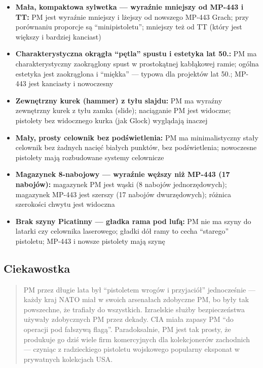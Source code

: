 \documentclass[12pt,oneside]{book}
\providecommand{\tightlist}{%
  \setlength{\itemsep}{0pt}\setlength{\parskip}{0pt}}
\begin{document}
\begin{itemize}
\tightlist
\item
  \textbf{Mała, kompaktowa sylwetka --- wyraźnie mniejszy od MP-443 i
  TT:} PM jest wyraźnie mniejszy i lżejszy od nowszego MP-443 Grach;
  przy porównaniu proporcje są ``minipistoletu''; mniejszy też od TT
  (który jest większy i bardziej kanciast)
\item
  \textbf{Charakterystyczna okrągła ``pętla'' spustu i estetyka lat
  50.:} PM ma charakterystyczny zaokrąglony spust w prostokątnej
  kabłąkowej ramie; ogólna estetyka jest zaokrąglona i ``miękka'' ---
  typowa dla projektów lat 50.; MP-443 jest kanciasty i nowoczesny
\item
  \textbf{Zewnętrzny kurek (hammer) z tyłu slajdu:} PM ma wyraźny
  zewnętrzny kurek z tyłu zamka (slide); naciąganie PM jest widoczne;
  pistolety bez widocznego kurka (jak Glock) wyglądają inaczej
\item
  \textbf{Mały, prosty celownik bez podświetlenia:} PM ma
  minimalistyczny stały celownik bez żadnych nacięć białych punktów, bez
  podświetlenia; nowoczesne pistolety mają rozbudowane systemy
  celownicze
\item
  \textbf{Magazynek 8-nabojowy --- wyraźnie węższy niż MP-443 (17
  nabojów):} magazynek PM jest wąski (8 nabojów jednorzędowych);
  magazynek MP-443 jest szerszy (17 nabojów dwurzędowych); różnica
  szerokości chwytu jest widoczna
\item
  \textbf{Brak szyny Picatinny --- gładka rama pod lufą:} PM nie ma
  szyny do latarki czy celownika laserowego; gładki dół ramy to cecha
  ``starego'' pistoletu; MP-443 i nowsze pistolety mają szynę
\end{itemize}

\subsection{Ciekawostka}\label{ciekawostka-101}

\begin{quote}
PM przez długie lata był ``pistoletem wrogów i przyjaciół'' jednocześnie
--- każdy kraj NATO miał w swoich arsenałach zdobyczne PM, bo były tak
powszechne, że trafiały do wszystkich. Izraelskie służby bezpieczeństwa
używały zdobycznych PM przez dekady. CIA miała zapasy PM ``do operacji
pod fałszywą flagą''. Paradoksalnie, PM jest tak prosty, że produkuje go
dziś wiele firm komercyjnych dla kolekcjonerów zachodnich --- czyniąc z
radzieckiego pistoletu wojskowego popularny eksponat w prywatnych
kolekcjach USA.
\end{quote}
\end{document}
